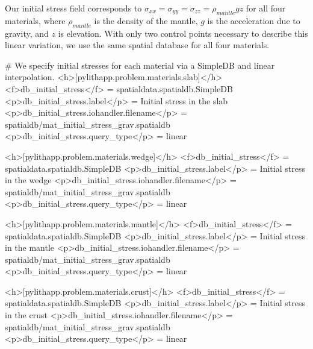 Our initial stress field corresponds to
$\sigma_\mathit{xx} = \sigma_\mathit{yy} = \sigma_\mathit{zz} =
\rho_\mathit{mantle} gz$ for all four materials, where $\rho_\mathit{mantle}$ is the density
of the mantle, $g$ is the acceleration due to gravity, and $z$ is
elevation. With only two control points necessary to describe this linear
variation, we use the same  spatial database for all
four materials.
\begin{cfg}
# We specify initial stresses for each material via a SimpleDB and linear interpolation.
<h>[pylithapp.problem.materials.slab]</h>
<f>db_initial_stress</f> = spatialdata.spatialdb.SimpleDB
<p>db_initial_stress.label</p> = Initial stress in the slab
<p>db_initial_stress.iohandler.filename</p> = spatialdb/mat_initial_stress_grav.spatialdb
<p>db_initial_stress.query_type</p> = linear

<h>[pylithapp.problem.materials.wedge]</h>
<f>db_initial_stress</f> = spatialdata.spatialdb.SimpleDB
<p>db_initial_stress.label</p> = Initial stress in the wedge
<p>db_initial_stress.iohandler.filename</p> = spatialdb/mat_initial_stress_grav.spatialdb
<p>db_initial_stress.query_type</p> = linear

<h>[pylithapp.problem.materials.mantle]</h>
<f>db_initial_stress</f> = spatialdata.spatialdb.SimpleDB
<p>db_initial_stress.label</p> = Initial stress in the mantle
<p>db_initial_stress.iohandler.filename</p> = spatialdb/mat_initial_stress_grav.spatialdb
<p>db_initial_stress.query_type</p> = linear

<h>[pylithapp.problem.materials.crust]</h>
<f>db_initial_stress</f> = spatialdata.spatialdb.SimpleDB
<p>db_initial_stress.label</p> = Initial stress in the crust
<p>db_initial_stress.iohandler.filename</p> = spatialdb/mat_initial_stress_grav.spatialdb
<p>db_initial_stress.query_type</p> = linear
\end{cfg}

